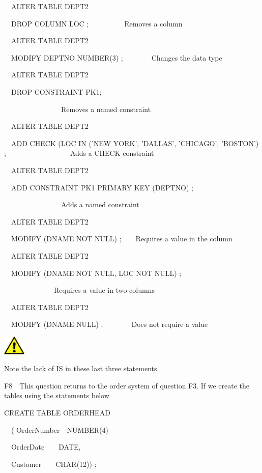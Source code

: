  \ \ ALTER TABLE DEPT2

\ \ DROP COLUMN LOC ;\ \ \ \ \ \ \ \ \ \ Removes a column

\ \ ALTER TABLE DEPT2

\ \ MODIFY DEPTNO NUMBER(3) ;\ \ \ \ \ \ \ \ Changes the data type

\ \ ALTER TABLE DEPT2

\ \ DROP CONSTRAINT PK1;

\ \ \ \ \ \ \ \ \ \ \ \ \ \ \ \ Removes a named constraint

\ \ ALTER TABLE DEPT2

\ \ ADD CHECK (LOC IN ('NEW YORK', 'DALLAS', 'CHICAGO', 'BOSTON') ;\ \ \ \ \ \ \ \ \ \ \ \ \ \ \ \ \ \ Adds a CHECK constraint

\ \ ALTER TABLE DEPT2 

\ \ ADD CONSTRAINT PK1 PRIMARY KEY (DEPTNO) ;

\ \ \ \ \ \ \ \ \ \ \ \ \ \ \ \ Adds a named constraint

\ \ ALTER TABLE DEPT2

\ \ MODIFY (DNAME NOT NULL) ;\ \ \ \ Requires a value in the column

\ \ ALTER TABLE DEPT2

\ \ MODIFY (DNAME NOT NULL, LOC NOT NULL) ;\ \ \ \ 

\ \ \ \ \ \ \ \ \ \ \ \ \ \ Requires a value in two columns

\ \ ALTER TABLE DEPT2

\ \ MODIFY (DNAME NULL) ;\ \ \ \ \ \ \ \ Does not require a value



\begin{center}
  
\includegraphics[width=1.076cm,height=0.917cm]{images/img (2).png}

\end{center}
Note the lack of IS in these last three statements.

F8\ \ This question returns to the order system of question F3. If we create the tables using the statements below

CREATE TABLE ORDERHEAD

\ \ ( OrderNumber\ \ NUMBER(4)

\ \   OrderDate\ \ \ \ DATE,

\ \   Customer\ \ \ \ CHAR(12)) ;

